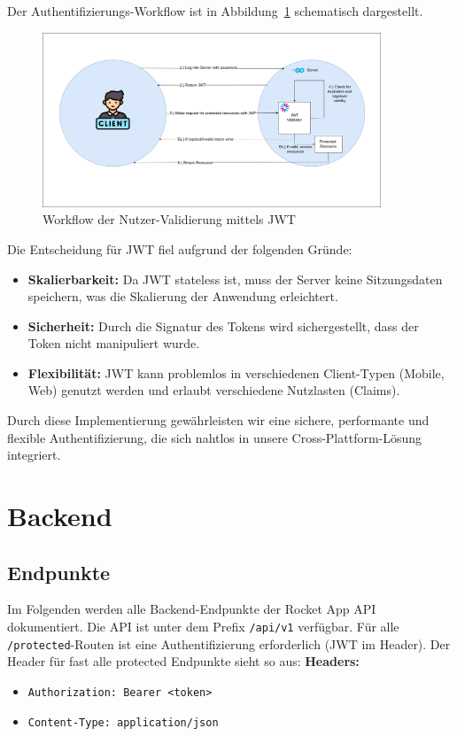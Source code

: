 \documentclass[11pt,a4paper]{article}
\begin{document}
Der Authentifizierungs-Workflow ist in Abbildung~\ref{fig:validation-workflow} schematisch dargestellt.

\begin{figure}[H]
    \centering
    \includegraphics[width=0.9\textwidth]{images/ValidationWorkflow.png}
    \caption{Workflow der Nutzer-Validierung mittels JWT}
    \label{fig:validation-workflow}
\end{figure}

Die Entscheidung für JWT fiel aufgrund der folgenden Gründe:
\begin{itemize}
    \item \textbf{Skalierbarkeit:} Da JWT stateless ist, muss der Server keine Sitzungsdaten speichern, was die Skalierung der Anwendung erleichtert.
    \item \textbf{Sicherheit:} Durch die Signatur des Tokens wird sichergestellt, dass der Token nicht manipuliert wurde.
    \item \textbf{Flexibilität:} JWT kann problemlos in verschiedenen Client-Typen (Mobile, Web) genutzt werden und erlaubt verschiedene Nutzlasten (Claims).
\end{itemize}

Durch diese Implementierung gewährleisten wir eine sichere, performante und flexible Authentifizierung, die sich nahtlos in unsere Cross-Plattform-Lösung integriert.

\section{Backend}

\subsection{Endpunkte}

Im Folgenden werden alle Backend-Endpunkte der Rocket App API dokumentiert. Die API ist unter dem Prefix \texttt{/api/v1} verfügbar. Für alle \texttt{/protected}-Routen ist eine Authentifizierung erforderlich (JWT im Header).
Der Header für fast alle protected Endpunkte sieht so aus: 
    \textbf{Headers:}
    \begin{itemize}
        \item \texttt{Authorization: Bearer <token>}
        \item \texttt{Content-Type: application/json}
    \end{itemize}
\end{document}
